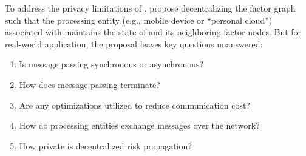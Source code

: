 To address the privacy limitations of \cRiskPropagation{}, \citet{Ayday2021} propose decentralizing the factor graph such that the processing entity (e.g., mobile device or ``personal cloud'') associated with  maintains the state of  and its neighboring factor nodes. But for real-world application, the proposal leaves key questions unanswered:
\begin{enumerate}
  \item Is message passing synchronous or asynchronous?
  \item How does message passing terminate?
  \item Are any optimizations utilized to reduce communication cost?
  \item How do processing entities exchange messages over the network?
  \item How private is decentralized risk propagation?
\end{enumerate}


%

